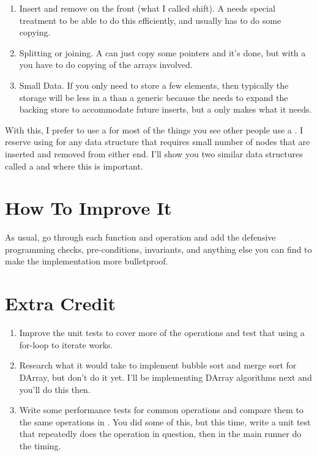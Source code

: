 \begin{enumerate}
\item Insert and remove on the front (what I called shift).  A  
    needs special treatment to be able to do this efficiently, and usually
    has to do some copying.
\item Splitting or joining.  A  can just copy some pointers and
    it's done, but with a  you have to do copying of the
    arrays involved.
\item Small Data. If you only need to store a few elements, then typically the
    storage will be less in a  than a generic  because
    the  needs to expand the backing store to accommodate future
    inserts, but a  only makes what it needs.
\end{enumerate}

With this, I prefer to use a  for most of the things you see
other people use a .  I reserve using  for any
data structure that requires small number of nodes that are inserted and
removed from either end.  I'll show you two similar data structures 
called a  and  where this is important.

\section{How To Improve It}

As usual, go through each function and operation and add the defensive programming
checks, pre-conditions, invariants, and anything else you can find to make the
implementation more bulletproof.

\section{Extra Credit}

\begin{enumerate}
\item Improve the unit tests to cover more of the operations and test that
    using a for-loop to iterate works.
\item Research what it would take to implement bubble sort and merge sort
    for DArray, but don't do it yet.  I'll be implementing DArray algorithms
    next and you'll do this then.
\item Write some performance tests for common operations and compare them
    to the same operations in .  You did some of this, but this
    time, write a unit test that repeatedly does the operation in question,
    then in the main runner do the timing.
\end{enumerate}



